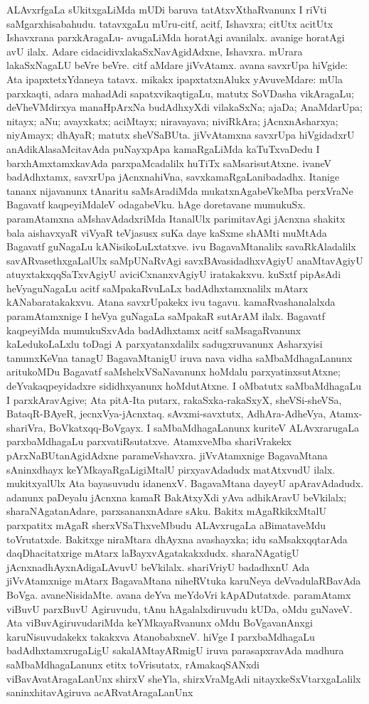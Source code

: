 ALAvxrfgaLa sUkitxgaLiMda mUDi baruva tatAtxvXthaRvanunx I riVti \hbox{saMgarxhisabahudu}. tatavxgaLu mUru-citf, acitf, Ishavxra; citUtx acitUtx Ishavxrana parxkAra\-gaLu- avu\-gaLiMda horatAgi avanilalx. avanige horatAgi avU ilalx. Adare cidacidivxlakaSxNavAgidAdxne, Ishavxra. mUrara lakaSxNagaLU beVre beVre. citf aMdare jiVvAtamx. avana savxrUpa hiVgide: Ata ipapxtetxYdaneya tatavx. mikakx ipapxtatxnAlukx yAvuveMdare: mUla parxkaqti, adara mahadAdi sapatxvikaqtigaLu, matutx SoVDasha vikAragaLu; deVheVMdirxya manaHpArxNa budAdhxyXdi vilakaSxNa; ajaDa; AnaMdarUpa; nitayx; aNu; avayxkatx; aciMtayx; niravayava; niviRkAra; jAcnxnAsharxya; niyAmayx; dhAyaR; matutx sheVSaBUta. jiVvAtamxna savxrUpa hiVgidadxrU anAdikAlasaMcitavAda puNayxpApa kamaRgaLiMda kaTuTxvaDedu I barxhAmxtamxkavAda parxpaMcadalilx huTiTx saMsarisutAtxne. ivaneV badAdhxtamx, savxrUpa jAcnxnahiVna, savxkamaRgaLanibadadhx. Itanige tananx nijavanunx tAnaritu saMsAradiMda mukatxnAga\-beVkeMba perxVraNe Bagavatf kaqpeyiMdaleV odagabeVku. hAge doretavane mumukuSx. paramAtamxna aMshavAdadxriMda ItanalUlx parimitavAgi jAcnxna shakitx bala aishavxyaR viVyaR teVjasusx suKa daye kaSxme shAMti muMtAda Bagavatf guNagaLu kANisikoLuLxtatxve. ivu BagavaMtanalilx savaRkAladalilx savARvasethxgaLalUlx saMpUNaRvAgi savxBAvasidadhxvAgiyU anaMtavAgiyU atuyxtakxqqSaTxvAgiyU aviciCxnanxvAgiyU iratakakxvu. kuSxtf pipAsAdi heVyaguNagaLu acitf saMpakaRvuLaLx badAdhxtamxnalilx mAtarx kANabaratakakxvu. Atana savxrUpakekx ivu tagavu. kamaRvashanalalxda paramAtamxnige I heVya guNagaLa saMpakaR sutArAM ilalx. Bagavatf kaqpeyiMda mumukuSxvAda badAdhxtamx acitf saMsagaRvanunx kaLedukoLaLxlu toDagi A parxyatanxdalilx sadugxruvanunx Asharxyisi tanumxKeVna tanagU BagavaMtanigU iruva nava vidha saMbaMdhagaLanunx aritukoMDu Bagavatf saMshelxVSaNavanunx hoMdalu parxyatinxsutAtxne; deYvakaqpeyidadxre sididhxyanunx hoMdutAtxne. I oMbatutx saMbaMdhagaLu I parxkAravAgive; Ata pitA-Ita putarx, rakaSxka-rakaSxyX, sheVSi-sheVSa, BataqR-BAyeR, jecnxVya-jAcnxtaq. sAvxmi-savxtutx, AdhAra-AdheVya, Atamx-shariVra, BoVkatxqq-BoVgayx. I saMbaMdhagaLanunx kuriteV ALAvxrarugaLa parxbaMdhagaLu parxvatiRsutatxve. AtamxveMba shariVrakekx pArxNaBUtanAgidAdxne parameVshavxra. jiVvAtamxnige BagavaMtana sAninxdhayx keYMkayaRgaLigiMtalU pirxyavAdadudx matAtxvudU ilalx. mukitxyalUlx Ata bayasuvudu idanenxV. BagavaMtana dayeyU apAravAdadudx. adanunx paDeyalu jAcnxna kamaR BakAtxyXdi yAva adhikAravU beVkilalx; sharaNAgatanAdare, parxsananxnAdare sAku. Bakitx mAgaRkikxMtalU parxpatitx mAgaR sherxVSaThxveMbudu ALAvxrugaLa aBimataveMdu toVrutatxde. Bakitxge niraMtara dhAyxna avashayxka; idu saMsakxqqtarAda daqDhacitatxrige mAtarx laBayxvAgatakakxdudx. sharaNAgatigU jAcnxnadhAyxnAdigaLAvuvU beVkilalx. shariVriyU badadhxnU Ada jiVvAtamxnige mAtarx BagavaMtana niheRVtuka karuNeya deVvadulaRBavAda BoVga. avaneNisidaMte. avana deYva meYdoVri kApADutatxde. paramAtamx viBuvU parxBuvU Agiruvudu, tAnu hAgalalxdiruvudu kUDa, oMdu guNaveV. Ata viBuvAgiruvudariMda keYMkayaRvanunx oMdu BoVgavanAnxgi karuNisuvudakekx takakxva AtanobabxneV. hiVge I parxbaMdhagaLu badAdhxtamxrugaLigU sakalAMtayARmigU iruva parasapxravAda madhura saMbaMdhagaLanunx etitx toVrisutatx, rAmakaqSANxdi viBavAvatAragaLanUnx shirxV sheYla, shirxVraMgAdi nitayxkeSxVtarxgaLalilx saninxhitavAgiruva acARvatAragaLanUnx 